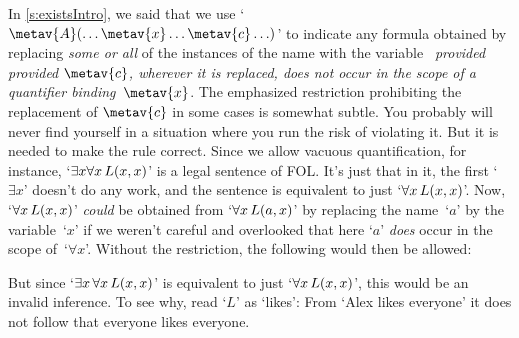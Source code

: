 In \cref{s:existsIntro}, we said that we use `$\metav{A}(\ldots
\metav{x} \ldots \metav{c}\ldots)$' to indicate any formula obtained
by replacing \emph{some or all} of the instances of the name 
with the variable~ \emph{provided provided $\metav{c}$,
wherever it is replaced, does not occur in the scope of a quantifier
binding~$\metav{x}$}. The emphasized restriction prohibiting the
replacement of $\metav{c}$ in some cases is somewhat subtle. You
probably will never find yourself in a situation where you run the
risk of violating it. But it is needed to make the rule correct.
Since we allow vacuous quantification, for instance, `$\exists
x\forall x\,L(x,x)$' is a legal sentence of FOL. It's just that
in it, the first `$\exists x$' doesn't do any work, and the sentence
is equivalent to just `$\forall x\,L(x,x)$'. Now, `$\forall
x\,L(x,x)$' \emph{could} be obtained from `$\forall
x\,L(a,x)$' by replacing the name~`$a$' by the variable~`$x$'
if we weren't careful and overlooked that here `$a$' \emph{does} occur
in the scope of~`$\forall x$'. Without the restriction, the following
would then be allowed:
\begin{fitchproof}
		\PR
		\ifHTMLtarget
	\else
	\fi\end{fitchproof}
But since `$\exists x\, \forall x\, L(x,x)$' is equivalent to
just `$\forall x\, L(x,x)$', this would be an invalid inference.
To see why, read `$L$' as `likes': From `Alex likes everyone' it does
not follow that everyone likes everyone.

